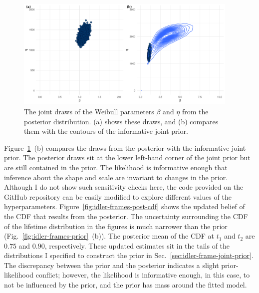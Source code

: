 

\begin{figure}[tbp]
  \centering
  \includegraphics[width=0.95\textwidth]{./figures/ch-3/idler-frame-post.pdf}
  \caption{The joint draws of the Weibull parameters $\beta$ and $\eta$ from the posterior distribution. (a) shows these draws, and (b) compares them with the contours of the informative joint prior.}
  \label{fig:idler-frames-post}
\end{figure}

Figure~\ref{fig:idler-frames-post}~(b) compares the draws from the posterior with the informative joint prior. The posterior draws sit at the lower left-hand corner of the joint prior but are still contained in the prior. The likelihood is informative enough that inference about the shape and scale are invariant to changes in the prior. Although I do not show such sensitivity checks here, the code provided on the GitHub repository can be easily modified to explore different values of the hyperparameters. Figure~\ref{fig:idler-frames-post-cdf} shows the updated belief of the CDF that results from the posterior. The uncertainty surrounding the CDF of the lifetime distribution in the figures is much narrower than the prior (Fig.~\ref{fig:idler-frames-prior}~(b)). The posterior mean of the CDF at $t_1$ and $t_2$ are $0.75$ and $0.90$, respectively. These updated estimates sit in the tails of the distributions I specified to construct the prior in Sec.~\ref{sec:idler-frame-joint-prior}. The discrepancy between the prior and the posterior indicates a slight prior-likelihood conflict; however, the likelihood is informative enough, in this case, to not be influenced by the prior, and the prior has mass around the fitted model.

